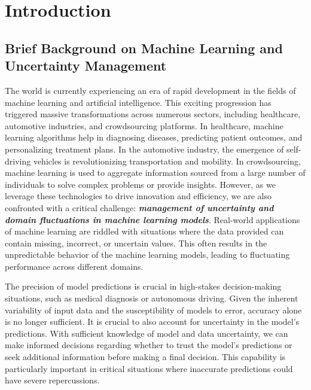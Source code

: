 \chapter{Introduction}

\section{Brief Background on Machine Learning and Uncertainty Management}
The world is currently experiencing an era of rapid development in the fields of machine learning and artificial intelligence. This exciting progression has triggered massive transformations across numerous sectors, including healthcare, automotive industries, and crowdsourcing platforms. In healthcare, machine learning algorithms help in diagnosing diseases, predicting patient outcomes, and personalizing treatment plans. In the automotive industry, the emergence of self-driving vehicles is revolutionizing transportation and mobility. In crowdsourcing, machine learning is used to aggregate information sourced from a large number of individuals to solve complex problems or provide insights. However, as we leverage these technologies to drive innovation and efficiency, we are also confronted with a critical challenge: \textit{\textbf{management of uncertainty and domain fluctuations in machine learning models}}. Real-world applications of machine learning are riddled with situations where the data provided can contain missing, incorrect, or uncertain values. This often results in the unpredictable behavior of the machine learning models, leading to fluctuating performance across different domains.

The precision of model predictions is crucial in high-stakes decision-making situations, such as medical diagnosis or autonomous driving. Given the inherent variability of input data and the susceptibility of models to error, accuracy alone is no longer sufficient. It is crucial to also account for uncertainty in the model's predictions. With sufficient knowledge of model and data uncertainty, we can make informed decisions regarding whether to trust the model's predictions or seek additional information before making a final decision. This capability is particularly important in critical situations where inaccurate predictions could have severe repercussions.

